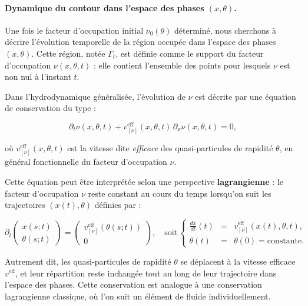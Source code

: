 \paragraph{Dynamique du contour dans l’espace des phases $(x, \theta)$.}
\label{sec:contour_GHD}

Une fois le facteur d’occupation initial $\nu_0(\theta)$ déterminé, nous cherchons à décrire l’évolution temporelle de la région occupée dans l’espace des phases $(x,\theta)$. Cette région, notée $\Gamma_t$, est définie comme le support du facteur d’occupation $\nu(x,\theta,t)$ : elle contient l’ensemble des points pour lesquels $\nu$ est non nul à l’instant $t$.

Dans l’hydrodynamique généralisée, l’évolution de $\nu$ est décrite par une équation de conservation du type :

\begin{equation}
\partial_t \nu(x,\theta,t) + v^{\mathrm{eff}}_{[\nu]}(x,\theta,t)\, \partial_x \nu(x,\theta,t) = 0,
\end{equation}

où $v^{\mathrm{eff}}_{[\nu]}(x,\theta,t)$ est la vitesse dite \textit{efficace} des quasi-particules de rapidité $\theta$, en général fonctionnelle du facteur d’occupation $\nu$.

Cette équation peut être interprétée selon une perspective \textbf{lagrangienne} : le facteur d’occupation $\nu$ reste constant au cours du temps lorsqu’on suit les trajectoires $(x(t), \theta)$ définies par :

\begin{equation}
\label{eq:traj_lagr}
\partial_t \left( \begin{array}{c} x(s;t) \\ \theta(s;t) \end{array} \right)  =  \left( \begin{array}{c} v^{\mathrm{eff}}_{[\nu]}(\theta(s;t)) \\ 0 \end{array} \right), \quad \mbox{soit} \, 
\left\{ \begin{array}{rcl}
\displaystyle \frac{d x}{dt}(t) & = & v^{\mathrm{eff}}_{[\nu]}(x(t), \theta, t), \\
\theta(t) & = & \theta(0) = \text{constante}.
\end{array} \right.
\end{equation}

Autrement dit, les quasi-particules de rapidité $\theta$ se déplacent à la vitesse efficace $v^{\mathrm{eff}}$, et leur répartition reste inchangée tout au long de leur trajectoire dans l’espace des phases. Cette conservation est analogue à une conservation lagrangienne classique, où l’on suit un élément de fluide individuellement.

